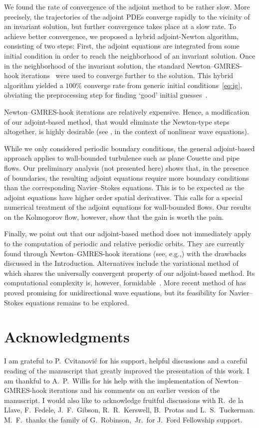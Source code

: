 \documentclass{article}
\begin{document}
We found the rate of convergence of the adjoint method to be rather slow. More precisely, the
trajectories of the adjoint PDEs converge rapidly to the vicinity of an invariant solution, but
further convergence takes place at a slow rate. To achieve better convergence, we proposed a
hybrid adjoint-Newton algorithm, consisting of two steps: First, the adjoint equations are
integrated from some initial condition in order to reach the neighborhood of an invariant solution.
Once in the neighborhood of the invariant solution, the standard Newton--GMRES-hook
iterations~\citep{DV04} were used to converge further to the solution. This hybrid algorithm
yielded a $100\%$ converge rate from generic initial conditions~\eqref{eq:ig},
obviating the preprocessing step for finding `good' initial guesses~\citep{DV04,CK13}.

Newton--GMRES-hook iterations are relatively expensive. Hence, a modification of
our adjoint-based method, that would eliminate the Newton-type steps altogether, is highly
desirable (see , in the context of nonlinear wave equations).

While we only considered periodic boundary conditions, the general adjoint-based approach applies
to wall-bounded turbulence such as plane Couette and pipe flows. Our preliminary analysis
(not presented here) shows that, in the presence of boundaries, the resulting adjoint equations
require more boundary conditions than the corresponding Navier--Stokes equations. This is to be
expected as the adjoint equations have higher order spatial derivatives. This calls for
a special numerical treatment of the adjoint equations for wall-bounded flows. Our results
on the Kolmogorov flow, however, show that the gain is worth the pain.

Finally, we point out that our adjoint-based method does not immediately
apply to the computation of periodic and relative periodic orbits.
They are currently found through Newton--GMRES-hook iterations
(see, e.g.,) with the drawbacks discussed in the Introduction.
Alternatives include the variational method of~ which shares the universally
convergent property of our adjoint-based method. Its computational complexity is, however,
formidable~\citep{Faz10}. More recent method of has proved promising for
unidirectional wave equations, but its feasibility for Navier--Stokes equations remains to
be explored.


\section*{Acknowledgments}
I am grateful to P.~Cvitanovi\'c for his support, helpful discussions
and a careful reading of the manuscript
that greatly improved the presentation of this work.
I am thankful to A.~P.~Willis for
his help with the implementation of Newton--GMRES-hook iterations
and his comments on an earlier version of the manuscript.
I would also like to acknowledge fruitful discussions with R.~de la Llave, F.~Fedele, J.~F.~Gibson,
R.~R.~Kerswell, B.~Protas and L.~S.~Tuckerman.
M.~F.\ thanks the family of G.~Robinson,~Jr.\ for J.~Ford Fellowship
support.
\end{document}
